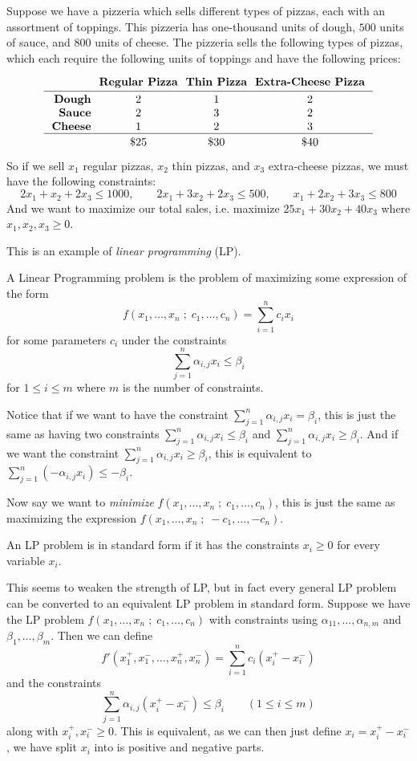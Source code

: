 Suppose we have a pizzeria which sells different types of pizzas, each with an assortment of toppings.
This pizzeria has one-thousand units of dough, $500$ units of sauce, and $800$ units of cheese.
The pizzeria sells the following types of pizzas, which each require the following units of toppings and have the following prices:

$$ \vbox{\tabskip=.25cm\halign{\hfil\bf#&&\hfil#\hfil\cr
&\bf Regular Pizza&\bf Thin Pizza&\bf Extra-Cheese Pizza\cr\noalign{\kern3pt\hrule\kern3pt}
Dough&2&1&2\cr
Sauce&2&3&2\cr
Cheese&1&2&3\cr\noalign{\kern3pt\hrule\kern3pt}
&\$25&\$30&\$40\cr}} $$

So if we sell $x_1$ regular pizzas, $x_2$ thin pizzas, and $x_3$ extra-cheese pizzas, we must have the following constraints:
$$ 2x_1 + x_2 + 2x_3 \leq 1000,\qquad 2x_1 + 3x_2 + 2x_3 \leq 500,\qquad x_1 + 2x_2 + 3x_3 \leq 800 $$
And we want to maximize our total sales, i.e. maximize $25x_1+30x_2+40x_3$ where $x_1,x_2,x_3\geq0$.

This is an example of {\it linear programming} (LP).

\bdefn

    A {\emphcolor Linear Programming} problem is the problem of maximizing some expression of the form
    $$ f(x_1,\dots,x_n\;;\;c_1,\dots,c_n)=\sum_{i=1}^nc_ix_i $$
    for some parameters $c_i$ under the constraints
    $$ \sum_{j=1}^n\alpha_{i,j}x_i\leq\beta_i $$
    for $1\leq i\leq m$ where $m$ is the number of constraints.

\edefn

Notice that if we want to have the constraint $\sum_{j=1}^n\alpha_{i,j}x_i=\beta_i$, this is just the same as having two constraints $\sum_{j=1}^n\alpha_{i,j}x_i\leq\beta_i$ and
$\sum_{j=1}^n\alpha_{i,j}x_i\geq\beta_i$.
And if we want the constraint $\sum_{j=1}^n\alpha_{i,j}x_i\geq\beta_i$, this is equivalent to $\sum_{j=1}^n(-\alpha_{i,j}x_i)\leq-\beta_i$.

Now say we want to {\it minimize} $f(x_1,\dots,x_n\;;\;c_1,\dots,c_n)$, this is just the same as maximizing the expression $f(x_1,\dots,x_n\;;\;-c_1,\dots,-c_n)$.

\bdefn

    An LP problem is in {\emphcolor standard form} if it has the constraints $x_i\geq0$ for every variable $x_i$.

\edefn

This seems to weaken the strength of LP, but in fact every general LP problem can be converted to an equivalent LP problem in standard form.
Suppose we have the LP problem $f(x_1,\dots,x_n\;;\;c_1,\dots,c_n)$ with constraints using $\alpha_{11},\dots,\alpha_{n,m}$ and $\beta_1,\dots,\beta_m$.
Then we can define
$$ f'(x_1^+,x_1^-,\dots,x_n^+,x_n^-) = \sum_{i=1}^n c_i(x_i^+-x_i^-) $$
and the constraints
$$ \sum_{j=1}^n\alpha_{i,j}(x_i^+-x_i^-) \leq \beta_i \qquad (1\leq i\leq m) $$
along with $x_i^+,x_i^-\geq0$.
This is equivalent, as we can then just define $x_i=x_i^+-x_i^-$, we have split $x_i$ into is positive and negative parts.

